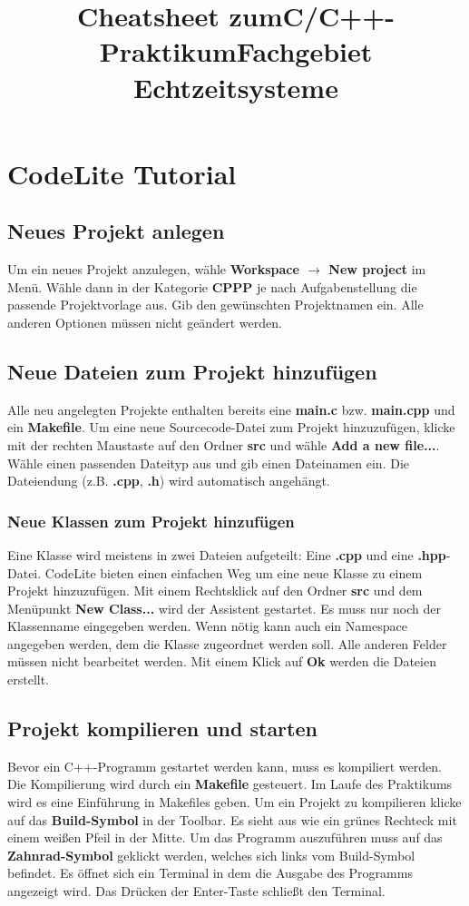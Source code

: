 \documentclass[
  accentcolor=tud1c,	%
  colorbacktitle,		%
  inverttitle,			%
  german,
  twoside
]{tudreport}
\title{Cheatsheet zum\linebreak[1]C/C++-Praktikum\linebreak[1] Fachgebiet Echtzeitsysteme}
\begin{document}
\maketitle

\chapter{CodeLite Tutorial}

\section{Neues Projekt anlegen}
Um ein neues Projekt anzulegen, wähle \textbf{Workspace $\rightarrow$ New project} im Menü. Wähle dann in der Kategorie \textbf{CPPP} je nach Aufgabenstellung die passende Projektvorlage aus.
Gib den gewünschten Projektnamen ein. Alle anderen Optionen müssen nicht geändert werden.

\section{Neue Dateien zum Projekt hinzufügen}
Alle neu angelegten Projekte enthalten bereits eine \textbf{main.c} bzw. \textbf{main.cpp} und ein \textbf{Makefile}.
Um eine neue Sourcecode-Datei zum Projekt hinzuzufügen, klicke mit der rechten Maustaste auf den Ordner \textbf{src} und wähle \textbf{Add a new file...}.
Wähle einen passenden Dateityp aus und gib einen Dateinamen ein. Die Dateiendung (z.B. \textbf{.cpp}, \textbf{.h}) wird automatisch angehängt.

\subsection{Neue Klassen zum Projekt hinzufügen}
Eine Klasse wird meistens in zwei Dateien aufgeteilt: Eine \textbf{.cpp} und eine \textbf{.hpp}-Datei. CodeLite bieten einen einfachen Weg um eine neue Klasse zu einem Projekt hinzuzufügen. Mit einem Rechtsklick auf den Ordner \textbf{src} und dem Menüpunkt \textbf{New Class...} wird der Assistent gestartet. Es muss nur noch der Klassenname eingegeben werden. Wenn nötig kann auch ein Namespace angegeben werden, dem die Klasse zugeordnet werden soll. Alle anderen Felder müssen nicht bearbeitet werden. Mit einem Klick auf \textbf{Ok} werden die Dateien erstellt.


\section{Projekt kompilieren und starten}
Bevor ein C++-Programm gestartet werden kann, muss es kompiliert werden.
Die Kompilierung wird durch ein \textbf{Makefile} gesteuert. Im Laufe des Praktikums wird es eine Einführung in Makefiles geben.
Um ein Projekt zu kompilieren klicke auf das \textbf{Build-Symbol} in der Toolbar. Es sieht aus wie ein grünes Rechteck mit einem weißen Pfeil in der Mitte.
Um das Programm auszuführen muss auf das \textbf{Zahnrad-Symbol} geklickt werden, welches sich links vom Build-Symbol befindet. Es öffnet sich ein Terminal in dem die Ausgabe des Programms angezeigt wird. Das Drücken der Enter-Taste schließt den Terminal.
\end{document}
